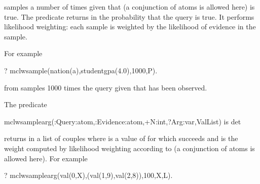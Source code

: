 \documentclass[letterpaper,10pt,english]{sphinxmanual}
\begin{document}
\begin{sphinxVerbatim}[commandchars=\\\{\}]
  
\end{sphinxVerbatim}

samples  a number of  times given that  (a conjunction of atoms is allowed here) is true.
The predicate returns in  the probability that the query is true.
It performs likelihood weighting: each sample is weighted by the likelihood of evidence in the sample.

For example

\begin{sphinxVerbatim}[commandchars=\\\{\}]
?\PYGZhy{} mc\PYGZus{}lw\PYGZus{}sample(nation(a),student\PYGZus{}gpa(4.0),1000,P).
\end{sphinxVerbatim}

from  samples 1000 times the query  given that  has been observed.

The predicate

\begin{sphinxVerbatim}[commandchars=\\\{\}]
mc\PYGZus{}lw\PYGZus{}sample\PYGZus{}arg(:Query:atom,:Evidence:atom,+N:int,?Arg:var,\PYGZhy{}ValList) is det
\end{sphinxVerbatim}

returns in  a list of couples  where  is a value of  for which  succeeds and  is the weight computed by likelihood weighting according to  (a conjunction of atoms is allowed here).
For example

\begin{sphinxVerbatim}[commandchars=\\\{\}]
?\PYGZhy{} mc\PYGZus{}lw\PYGZus{}sample\PYGZus{}arg(val(0,X),(val(1,9),val(2,8)),100,X,L).
\end{sphinxVerbatim}
\end{document}
